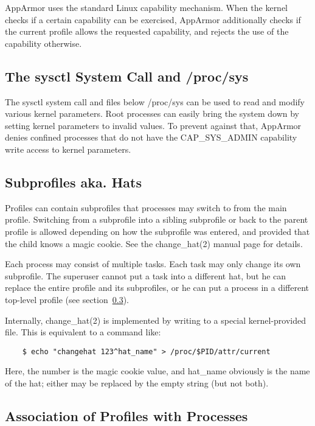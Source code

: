 \documentclass[a4paper]{article}
\renewcommand{\H}{\hspace{0pt}}
\begin{document}
AppArmor uses the standard Linux capability mechanism.  When the kernel
checks if a certain capability can be exercised, AppArmor additionally
checks if the current profile allows the requested capability, and
rejects the use of the capability otherwise.


\subsection{The sysctl System Call and /proc/sys}

The sysctl system call and files below /proc/sys
can be used to read and modify various kernel parameters.  Root processes
can easily bring the system down by setting kernel parameters to invalid
values.  To prevent against that, AppArmor denies confined processes
that do not have the CAP\_{\H}SYS\_{\H}ADMIN capability write access to kernel
parameters.


\subsection{Subprofiles aka. Hats}

Profiles can contain subprofiles that processes may switch to from the
main profile.  Switching from a subprofile into a sibling subprofile or
back to the parent profile is allowed depending on how the subprofile
was entered, and provided that the child knows a magic cookie.  See the
change\_hat(2) manual page for details.

Each process may consist of multiple tasks.  Each task may only change
its own subprofile.  The superuser cannot put a task into a different
hat, but he can replace the entire profile and its subprofiles, or he
can put a process in a different top-level profile (see
section~\ref{sec:association}).

Internally, change\_hat(2) is implemented by writing to a special
kernel-provided file.  This is equivalent to a command like:

\begin{small}
\begin{verbatim}
    $ echo "changehat 123^hat_name" > /proc/$PID/attr/current
\end{verbatim}
\end{small}

Here, the number is the magic cookie value, and hat\_name obviously is
the name of the hat; either may be replaced by the empty string (but not
both).


\subsection{Association of Profiles with Processes}
\label{sec:association}
\end{document}
